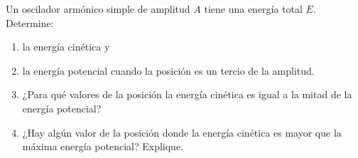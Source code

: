 \item Un oscilador armónico simple de amplitud $A$ tiene una energía total $E$. Determine:
\begin{enumerate}
    \item la energía cinética y
    \item la energía potencial cuando la posición es un tercio de la amplitud.
    \item ¿Para qué valores de la posición la energía cinética es igual a la mitad de la energía potencial?
    \item ¿Hay algún valor de la posición donde la energía cinética es mayor que la máxima energía potencial? Explique.
\end{enumerate}